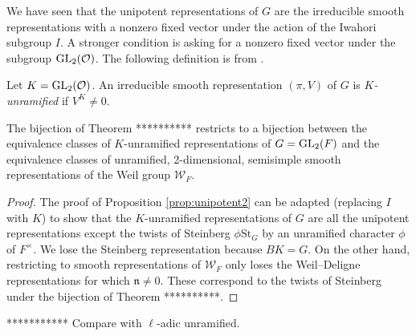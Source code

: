 We have seen that the unipotent representations of $G$ are the irreducible smooth representations with a nonzero fixed vector under the action of the Iwahori subgroup $I$. A stronger condition is asking for a nonzero fixed vector under the subgroup $\mathrm{GL}_2(\mathcal{O})$. The following definition is from \cite[Definition 7.1]{GH1}.

\begin{defn}
    Let $K=\mathrm{GL}_2(\mathcal{O})$. An irreducible smooth representation $(\pi,V)$ of $G$ is \textit{$K$-unramified} if $V^K \neq 0$.
\end{defn}

\begin{cor}
    The bijection of Theorem ********** restricts to a bijection between the equivalence classes of $K$-unramified representations of $G=\mathrm{GL}_2(F)$ and the equivalence classes of unramified, 2-dimensional, semisimple smooth representations of the Weil group $\mathcal W_F$.    
\end{cor}
\begin{proof}
    The proof of Proposition \ref{prop:unipotent2} can be adapted (replacing $I$ with $K$) to show that the $K$-unramified representations of $G$ are all the unipotent representations except the twists of Steinberg $\phi \mathrm{St}_G$ by an unramified character $\phi$ of $F^\times$. We lose the Steinberg representation because $BK=G$. On the other hand, restricting to smooth representations of $\mathcal W_F$ only loses the Weil--Deligne representations for which $\mathfrak n \neq 0$. These correspond to the twists of Steinberg under the bijection of Theorem **********.
\end{proof}
\begin{rem}
    *********** Compare with $\ell$-adic unramified.
\end{rem}



